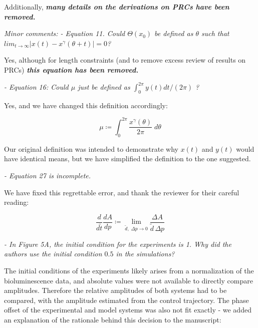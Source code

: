\documentclass[11pt, letterpaper]{article}
\newenvironment{reviewer}{\itshape\color{gray}}{}
\newenvironment{manuscript}[1]{\begin{center}\begin{tcolorbox}[colback=green!5!white,colframe=green!75!black,width=0.8\textwidth,title={#1},breakable,fonttitle=\bfseries]}{\end{tcolorbox}\end{center}}
\begin{document}
Additionally, {\itshape\bfseries many details on the derivations on PRCs have been removed.}

\begin{reviewer}
Minor comments: 
- Equation 11.
Could $\Theta(x_0)$ be defined as $\theta$ such that $lim_{t\rightarrow \infty} | x(t)-x^\gamma(\theta+t)|=0$?
\end{reviewer}

Yes, although for length constraints (and to remove excess review of results on PRCs) {\itshape\bfseries this equation has been removed.}

\begin{reviewer}
- Equation 16: Could $\mu$ just be defined as $\int_0^{2\pi} y(t)dt/(2\pi)$ ?
\end{reviewer}

Yes, and we have changed this definition accordingly:

\begin{manuscript}{Page 7}
\begin{equation}
  \mu \coloneqq \int_0^{2\pi} \frac{x^\gamma(\theta)}{2\pi} \; d\theta
  \tag{21}
\end{equation}
\end{manuscript}

Our original definition was intended to demonstrate why $x(t)$ and $y(t)$ would have identical means, but we have simplified the definition to the one suggested.

\begin{reviewer}
- Equation 27 is incomplete. 
\end{reviewer}
 
We have fixed this regrettable error, and thank the reviewer for their careful reading:

\begin{manuscript}{Page 10}
\begin{equation}
  \frac{d}{d\tilde{t}}\frac{dA}{dp} \coloneqq \lim_{\tilde{d},\; \Delta p \to 0} \frac{\Delta A}{\tilde{d}\, \Delta p}
  \tag{31}
\end{equation}
\end{manuscript}

\begin{reviewer}
- In Figure 5A, the initial condition for the experiments is 1. Why did the authors use the initial condition $0.5$ in the simulations?
\end{reviewer}

The initial conditions of the experiments likely arises from a normalization of the bioluminescence data, and absolute values were not available to directly compare amplitudes.
Therefore the relative amplitudes of both systems had to be compared, with the amplitude estimated from the control trajectory.
The phase offset of the experimental and model systems was also not fit exactly - we added an explanation of the rationale behind this decision to the manuscript:
\end{document}
